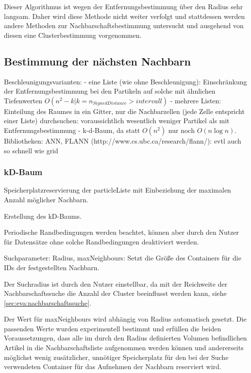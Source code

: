 Dieser Algorithmus ist wegen der Entfernungsbestimmung über den Radius sehr langsam. Daher wird diese Methode nicht weiter verfolgt und stattdessen werden andere Methoden zur Nachbarschaftsbestimmung untersucht und ausgehend von diesen eine Clusterbestimmung vorgenommen.

\subsection{Bestimmung der nächsten Nachbarn}\label{sec:nachbarschaftssuche}
Beschleunigungsvarianten:
- eine Liste (wie ohne Beschleunigung): Einschränkung der Entfernungsbestimmung bei den Partikeln auf solche mit ähnlichen Tiefenwerten $O(n^2 - k | k = n_{SignedDistance} > intervall)$
- mehrere Listen: Einteilung des Raumes in ein Gitter, nur die Nachbarzellen (jede Zelle entspricht einer Liste) durchsuchen: voraussichtlich wesentlich weniger Partikel als mit Entfernungsbestimmung
- k-d-Baum, da statt $O(n^2)$ nur noch $O(n \log n)$. Bibliotheken: ANN, FLANN (http://www.cs.ubc.ca/research/flann/): evtl auch so schnell wie grid

\subsubsection{kD-Baum}

Speicherplatzreservierung der particleListe mit Einbeziehung der maximalen Anzahl möglicher Nachbarn.

Erstellung des kD-Baums.

Periodische Randbedingungen werden beachtet, können aber durch den Nutzer für Datensätze ohne solche Randbedingungen deaktiviert werden.

Suchparameter: Radius, maxNeighbours: Setzt die Größe des Containers für die IDs der festgestellten Nachbarn.

Der Suchradius ist durch den Nutzer einstellbar, da mit der Reichweite der Nachbarschaftssuche die Anzahl der Cluster beeinflusst werden kann, siehe \autoref{sec:eva:nachbarschaftssuche}.

Der Wert für maxNeighbours wird abhängig von Radius automatisch gesetzt. Die passenden Werte wurden experimentell bestimmt und erfüllen die beiden Voraussetzungen, dass alle im durch den Radius definierten Volumen befindlichen Artikel in die Nachbarschaftsliste aufgenommen werden können und andererseits möglichst wenig zusätzlicher, unnötiger Speicherplatz für den bei der Suche verwendeten Container für das Aufnehmen der Nachbarn reserviert wird. %

